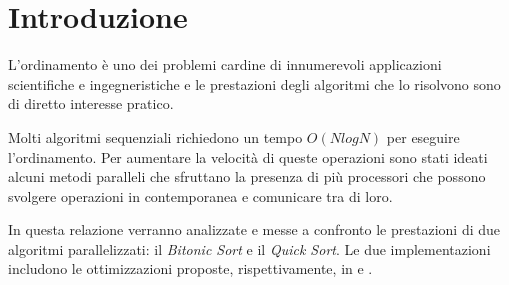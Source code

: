 \chapter{Introduzione}

L'ordinamento è uno dei problemi cardine di innumerevoli applicazioni scientifiche e ingegneristiche e le prestazioni degli algoritmi che lo risolvono sono di diretto interesse pratico.

Molti algoritmi sequenziali richiedono un tempo $O(NlogN)$ per eseguire l'ordinamento. Per aumentare la velocità di queste operazioni sono stati ideati alcuni metodi paralleli che sfruttano la presenza di più processori che possono svolgere operazioni in contemporanea e comunicare tra di loro.

In questa relazione verranno analizzate e messe a confronto le prestazioni di due algoritmi parallelizzati: il \textit{Bitonic Sort} e il \textit{Quick Sort}. Le due implementazioni includono le ottimizzazioni proposte, rispettivamente, in \cite{PaperBitonic} e \cite{PaperQuickSort}.
